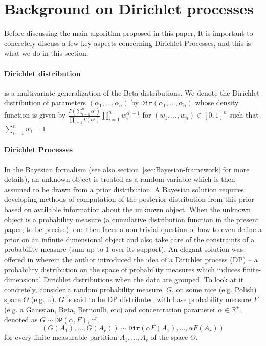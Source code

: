 \documentclass[10pt]{article}
\def\R{\mathbb{R}}
\newcommand{\Dir}{\texttt{Dir}}
\newcommand{\DP}{\texttt{DP}}
\begin{document}
\section{Background on Dirichlet processes}
\label{sec:Background-DP}

Before discussing the main algorithm proposed in this paper, It is important to concretely discuss a few key aspects concerning Dirichlet Processes, and this is what we do in this section. 

\paragraph{Dirichlet distribution} is a multivariate generalization of the Beta distributions.  We denote the Dirichlet distribution of parameters $(\alpha_{1},. . .,\alpha_{n})$ by $\Dir(\alpha_{1},. . .,\alpha_{n})$ whose density function is given by $\frac{\Gamma(\sum_{i=1}^{n}\alpha^{i})}{\prod_{i=1}^{n}\Gamma(\alpha^{i})} \prod_{i=1}^{n}w_{i}^{\alpha^{i}-1}$ for $(w_{1},. . .,w_{n}) \in [0,1]^{n}$ such that $\sum_{i=1}^{n}w_{i} = 1$
\paragraph{Dirichlet Processes} In the Bayesian formalism (see also section~\ref{sec:Bayesian-framework} for more details), an unknown object is treated as a random variable which is then assumed to be drawn from a prior distribution. A Bayesian solution requires developing methods of computation of the posterior distribution from this prior based on available information about the unknown object. When the unknown object is a probability measure (a cumulative distribution function in the present paper, to be precise), one then faces a non-trivial question of how to even define a prior on an infinite dimensional object and also take care of the constraints of a probability measure (sum up to 1 over its support).  An elegant solution was offered in \cite{ferguson1973bayesian} wherein the author introduced the idea
of a Dirichlet process (DP) – a probability distribution on the space of probability measures which induces finite-dimensional Dirichlet distributions when the data are grouped. To look at it concretely, consider a  random probability measure, $G$, on some nice (e.g. Polish) space $\Theta$ (e.g. $\R$). $G$ is said to be DP distributed with base probability measure $F$ (e.g. a Gaussian, Beta, Bernoulli, etc) and concentration parameter $\alpha \in \mathbb{R}^{+}$, denoted as $G \sim \DP(\alpha,F)$, if
\[(G(A_1), . . . , G(A_r)) \sim \Dir(\alpha F(A_1), . . . , \alpha F(A_r)) \]
for every finite measurable partition $A_1,...,A_r$ of the space $\Theta$. 
\end{document}
